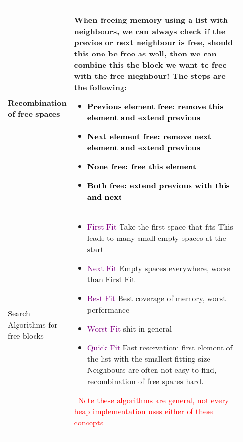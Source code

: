 \documentclass[main.tex,fontsize=8pt,paper=a4,paper=portrait,DIV=calc,]{scrartcl}
\begin{document}
\pagebreak 
\begin{table}[ht!]
\begin{tabular}{|m{0.2\linewidth}|m{0.755\linewidth}|}
\hline
Recombination of free spaces & 
When freeing memory using a list with neighbours, we can always check if the previos or next neighbour is free, should this one be free as well, then we can combine this the block we want to free with the free nieghbour!\newline
The steps are the following:\newline
\begin{itemize}
\item \textcolor{black}{Previous element free: remove this element and extend previous}
\item \textcolor{black}{Next element free: remove next element and extend previous}
\item \textcolor{black}{None free: free this element}
\item \textcolor{black}{Both free: extend previous with this and next}
\vspace{-3mm}
\end{itemize} \\
\hline
Search Algorithms for free blocks &
\vspace{2mm}
\begin{itemize}
\item \textcolor{purple}{First Fit}\newline
  Take the first space that fits\newline
  This leads to many small empty spaces at the start
\item \textcolor{purple}{Next Fit}\newline
  Empty spaces everywhere, worse than First Fit
\item \textcolor{purple}{Best Fit}\newline
  Best coverage of memory, worst performance
\item \textcolor{purple}{Worst Fit}\newline
  shit in general
\item \textcolor{purple}{Quick Fit}\newline
Fast reservation: first element of the list with the smallest fitting size\newline
Neighbours are often not easy to find, recombination of free spaces hard.
\vspace{-3mm}
\end{itemize} 
\, \newline
\textcolor{red}{Note these algorithms are general, not every heap implementation uses either of these concepts}\\

\end{tabular}
\end{table}
\end{document}
